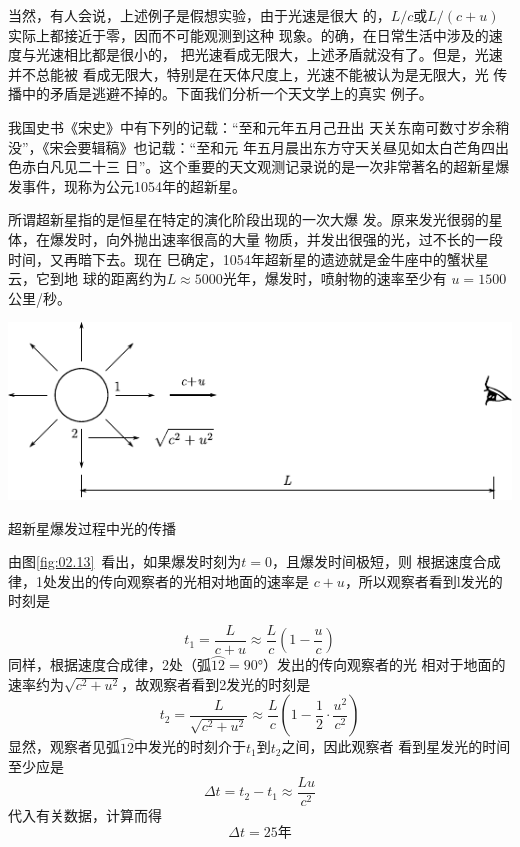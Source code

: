 当然，有人会说，上述例子是假想实验，由于光速是很大
的，$L/c$或$L/(c+u)$实际上都接近于零，因而不可能观测到这种
现象。的确，在日常生活中涉及的速度与光速相比都是很小的，
把光速看成无限大，上述矛盾就没有了。但是，光速并不总能被
看成无限大，特别是在天体尺度上，光速不能被认为是无限大，光
传播中的矛盾是逃避不掉的。下面我们分析一个天文学上的真实
例子。

我国史书《宋史》中有下列的记载：“至和元年五月己丑出
天关东南可数寸岁余稍没”，《宋会要辑稿》也记载：“至和元
年五月晨出东方守天关昼见如太白芒角四出色赤白凡见二十三
日”。这个重要的天文观测记录说的是一次非常著名的超新星爆
发事件，现称为公元1054年的超新星。

所谓超新星指的是恒星在特定的演化阶段出现的一次大爆
发。原来发光很弱的星体，在爆发时，向外抛出速率很高的大量
物质，并发出很强的光，过不长的一段时间，又再暗下去。现在
巳确定，1054年超新星的遗迹就是金牛座中的蟹状星云，它到地
球的距离约为$L \approx 5000$光年，爆发时，喷射物的速率至少有
$u=1500$公里/秒。
\begin{figurex}
    \centering
    \includegraphics{figure/fig02.13}
    \caption{超新星爆发过程中光的传播}
    \label{fig:02.13}
\end{figurex}

由图\ref{fig:02.13}~看出，如果爆发时刻为$t=0$，且爆发时间极短，则
根据速度合成律，1处发出的传向观察者的光相对地面的速率是
$c+u$，所以观察者看到l发光的时刻是

\begin{equation*}
    t_{1}=\frac{L}{c+u} \approx \frac{L}{c}\left(1-\frac{u}{c}\right)
\end{equation*}
同样，根据速度合成律，2处（弧$\wideparen{12}=\ang{90;;}$）发出的传向观察者的光
相对于地面的速率约为$\sqrt{c^2 + u^2}$，故观察者看到2发光的时刻是
\begin{equation*}
    t_{2}=\frac{L}{\sqrt{c^{2}+u^{2}}} \approx \frac{L}{c}\left(1-\frac{1}{2} \cdot \frac{u^{2}}{c^{2}}\right)
\end{equation*}
显然，观察者见弧$\wideparen{12}$中发光的时刻介于$t_1$到$t_2$之间，因此观察者
看到星发光的时间至少应是
\begin{equation*}
    \Delta t=t_{2}-t_{1} \approx \frac{Lu}{c^{2}}
\end{equation*}
代入有关数据，计算而得
\begin{equation*}
    \Delta t=25\text{年}
\end{equation*}


